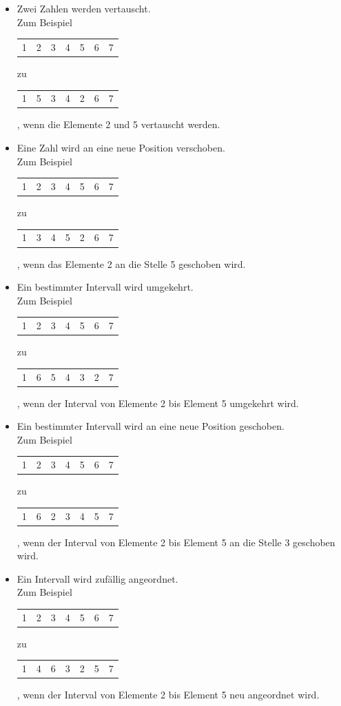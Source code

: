 \documentclass[a4paper,notitlepage,12pt]{report}
\begin{document}
\begin{itemize}
    \item Zwei Zahlen werden vertauscht. \\
        Zum Beispiel
        \begin{tabular}{c|c|c|c|c|c|c}
            1 & 2 & 3 & 4 & 5 & 6 & 7
        \end{tabular}
        zu
        \begin{tabular}{c|c|c|c|c|c|c}
            1 & 5 & 3 & 4 & 2 & 6 & 7
        \end{tabular},
        wenn die Elemente 2 und 5 vertauscht werden.
    \item Eine Zahl wird an eine neue Position verschoben. \\
        Zum Beispiel
        \begin{tabular}{c|c|c|c|c|c|c}
            1 & 2 & 3 & 4 & 5 & 6 & 7
        \end{tabular}
        zu
        \begin{tabular}{c|c|c|c|c|c|c}
            1 & 3 & 4 & 5 & 2 & 6 & 7
        \end{tabular},
        wenn das Elemente 2 an die Stelle 5 geschoben wird.
    \item Ein bestimmter Intervall wird umgekehrt. \\
        Zum Beispiel
        \begin{tabular}{c|c|c|c|c|c|c}
            1 & 2 & 3 & 4 & 5 & 6 & 7
        \end{tabular}
        zu
        \begin{tabular}{c|c|c|c|c|c|c}
            1 & 6 & 5 & 4 & 3 & 2 & 7
        \end{tabular},
        wenn der Interval von Elemente 2 bis Element 5 umgekehrt wird.
    \item Ein bestimmter Intervall wird an eine neue Position geschoben. \\
        Zum Beispiel
        \begin{tabular}{c|c|c|c|c|c|c}
            1 & 2 & 3 & 4 & 5 & 6 & 7
        \end{tabular}
        zu
        \begin{tabular}{c|c|c|c|c|c|c}
            1 & 6 & 2 & 3 & 4 & 5 & 7
        \end{tabular},
        wenn der Interval von Elemente 2 bis Element 5 an die Stelle 3 geschoben wird.
    \item Ein Intervall wird zufällig angeordnet. \\
        Zum Beispiel
        \begin{tabular}{c|c|c|c|c|c|c}
            1 & 2 & 3 & 4 & 5 & 6 & 7
        \end{tabular}
        zu
        \begin{tabular}{c|c|c|c|c|c|c}
            1 & 4 & 6 & 3 & 2 & 5 & 7
        \end{tabular},
        wenn der Interval von Elemente 2 bis Element 5 neu angeordnet wird.
\end{itemize}
\end{document}
